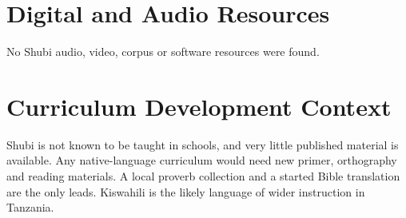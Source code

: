 \documentclass[12pt]{article}
\begin{document}
\section{Digital and Audio Resources}
No Shubi audio, video, corpus or software resources were found.

\section{Curriculum Development Context}
Shubi is not known to be taught in schools, and very little published material is available. Any native-language curriculum would need new primer, orthography and reading materials. A local proverb collection and a started Bible translation are the only leads. Kiswahili is the likely language of wider instruction in Tanzania.
\end{document}
